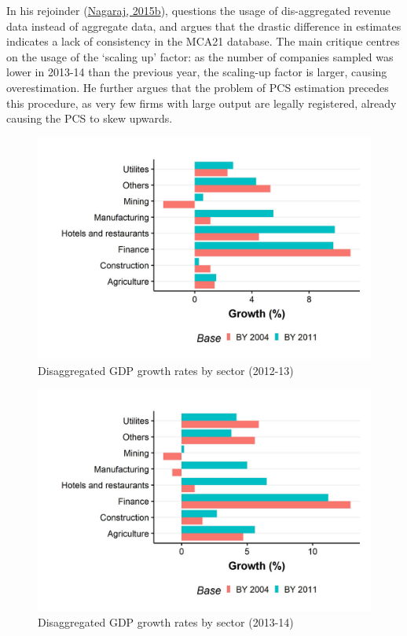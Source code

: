 \documentclass[12pt,nobind, a4paper]{reedthesis}
\begin{document}
 In his rejoinder (\protect\hyperlink{ref-nagaraj_seeds_2015}{Nagaraj, 2015b}), questions the usage of dis-aggregated revenue data instead of aggregate data, and argues that the drastic difference in estimates indicates a lack of consistency in the MCA21 database. The main critique centres on the usage of the `scaling up' factor: as the number of companies sampled was lower in 2013-14 than the previous year, the scaling-up factor is larger, causing overestimation. He further argues that the problem of PCS estimation precedes this procedure, as very few firms with large output are legally registered, already causing the PCS to skew upwards.
 \begin{figure}

 {\centering \includegraphics[width=1\linewidth]{figure/nagaraj1} 

 }

 \caption{Disaggregated GDP growth rates by sector (2012-13)}\label{fig:nag1}
 \end{figure}
 \begin{figure}

 {\centering \includegraphics[width=1\linewidth]{figure/nagaraj2} 

 }

 \caption{Disaggregated GDP growth rates by sector (2013-14)}\label{fig:nag2}
 \end{figure}
\end{document}

